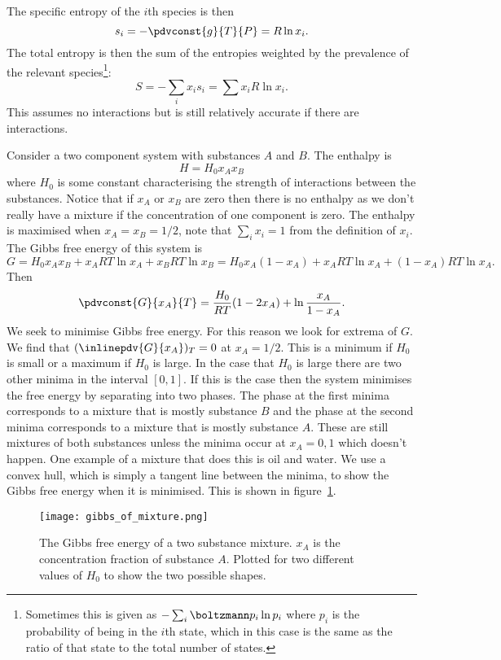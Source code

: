     The specific entropy of the \(i\)th species is then
    \[s_i = -\pdvconst{g}{T}{P} = R\ln x_i.\]
    The total entropy is then the sum of the entropies weighted by the prevalence of the relevant species\footnote{Sometimes this is given as \(-\sum_i \boltzmann p_i\ln p_i\) where \(p_i\) is the probability of being in the \(i\)th state, which in this case is the same as the ratio of that state to the total number of states.}:
    \[S = -\sum_i x_is_i = \sum x_iR\ln x_i.\]
    This assumes no interactions but is still relatively accurate if there are interactions.
    
    Consider a two component system with substances \(A\) and \(B\).
    The enthalpy is
    \[H = H_0x_Ax_B\]
    where \(H_0\) is some constant characterising the strength of interactions between the substances.
    Notice that if \(x_A\) or \(x_B\) are zero then there is no enthalpy as we don't really have a mixture if the concentration of one component is zero.
    The enthalpy is maximised when \(x_A = x_B = 1/2\), note that \(\sum_i x_i = 1\) from the definition of \(x_i\).
    The Gibbs free energy of this system is
    \[G = H_0x_Ax_B + x_ART\ln x_A + x_BRT\ln x_B = H_0x_A(1 - x_A) + x_ART\ln x_A + (1 - x_A)RT\ln x_A.\]
    Then
    \[\pdvconst{G}{x_A}{T} = \frac{H_0}{RT}(1 - 2x_A) + \ln\frac{x_A}{1 - x_A}.\]
    We seek to minimise Gibbs free energy.
    For this reason we look for extrema of \(G\).
    We find that \((\inlinepdv{G}{x_A})_T = 0\) at \(x_A = 1/2\).
    This is a minimum if \(H_0\) is small or a maximum if \(H_0\) is large.
    In the case that \(H_0\) is large there are two other minima in the interval \([0, 1]\).
    If this is the case then the system minimises the free energy by separating into two phases.
    The phase at the first minima corresponds to a mixture that is mostly substance \(B\) and the phase at the second minima corresponds to a mixture that is mostly substance \(A\).
    These are still mixtures of both substances unless the minima occur at \(x_A = 0, 1\) which doesn't happen.
    One example of a mixture that does this is oil and water.
    We use a convex hull, which is simply a tangent line between the minima, to show the Gibbs free energy when it is minimised.
    This is shown in figure~\ref{fig:gibbs mixture}.
    \begin{figure}[ht]
        \centering
        \texttt{[image: gibbs\_of\_mixture.png]}
        \caption{The Gibbs free energy of a two substance mixture.
        \(x_A\) is the concentration fraction of substance \(A\).
        Plotted for two different values of \(H_0\) to show the two possible shapes.}
        \label{fig:gibbs mixture}
    \end{figure}
    
